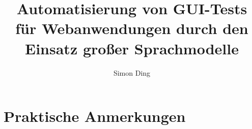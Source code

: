 \documentclass[twoside, ngerman]{sdqthesis}
\author{Simon Ding}
\title{Automatisierung von GUI-Tests für Webanwendungen durch den Einsatz großer Sprachmodelle}
\begin{document}
\setpdf

\maketitle

\frontmatter



\setcounter{page}{1}

 


\tableofcontents



\mainmatter






\printbibliography[heading=bibintoc]

\appendix

\chapter{Praktische Anmerkungen}
\label{ch:PracticalNotes}
\end{document}
